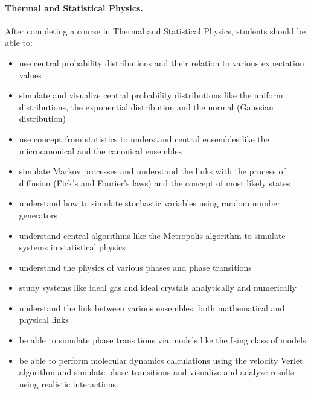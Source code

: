 \documentclass[graybox,envcountchap,sectrefs]{svmult}
\begin{document}
\noindent
\paragraph{Thermal and Statistical Physics.}
After completing a course in Thermal and Statistical Physics, students should be able to:
\begin{itemize}
\item use central probability distributions and their relation to various expectation values

\item simulate and visualize central probability distributions like the uniform distributions, the exponential distribution and the normal (Gaussian distribution)

\item use concept from statistics to understand central ensembles like the microcanonical and the canonical ensembles

\item simulate Markov processes and understand the links with the process of diffusion (Fick's and Fourier's laws) and the concept of most likely states

\item understand how to simulate stochastic variables using random number generators

\item understand central algorithms like the Metropolis algorithm to simulate systems in statistical physics

\item understand the physics of various phases and phase transitions

\item study systems like ideal gas and ideal crystals analytically and numerically

\item understand the link between various ensembles; both mathematical and physical links

\item be able to simulate phase transitions via models like the Ising class of models

\item be able to perform molecular dynamics calculations using the velocity Verlet algorithm and simulate phase transitions and visualize and analyze results using realistic interactions.
\end{itemize}

\noindent
\end{document}
